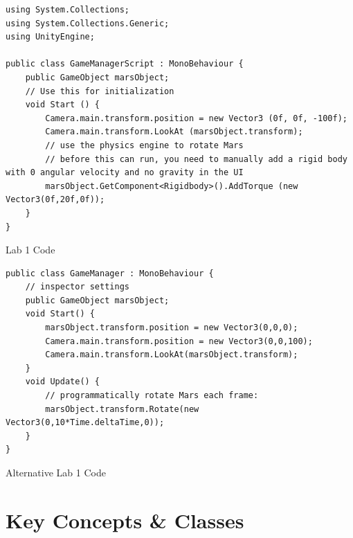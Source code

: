 \documentclass[a4paper,11pt]{article}
\newenvironment{code}{\captionsetup{type=listing}}{}
\begin{document}
\begin{code}
\begin{verbatim}
using System.Collections;
using System.Collections.Generic;
using UnityEngine;

public class GameManagerScript : MonoBehaviour {
    public GameObject marsObject;
    // Use this for initialization
    void Start () {
        Camera.main.transform.position = new Vector3 (0f, 0f, -100f);
        Camera.main.transform.LookAt (marsObject.transform);
        // use the physics engine to rotate Mars
        // before this can run, you need to manually add a rigid body with 0 angular velocity and no gravity in the UI
        marsObject.GetComponent<Rigidbody>().AddTorque (new Vector3(0f,20f,0f));
    }
}
\end{verbatim}
\caption{Lab 1 Code}
\end{code}

\begin{code}
\begin{verbatim}
public class GameManager : MonoBehaviour {
    // inspector settings
    public GameObject marsObject;
    void Start() {
        marsObject.transform.position = new Vector3(0,0,0);
        Camera.main.transform.position = new Vector3(0,0,100);
        Camera.main.transform.LookAt(marsObject.transform);
    }
    void Update() {
        // programmatically rotate Mars each frame:
        marsObject.transform.Rotate(new Vector3(0,10*Time.deltaTime,0));
    }
}
\end{verbatim}
\caption{Alternative Lab 1 Code}
\end{code}

\section{Key Concepts \& Classes}
\end{document}
